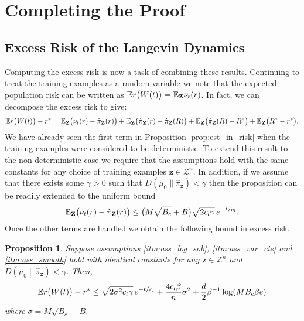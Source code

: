 \documentclass{article}
\newtheorem{proposition}[theorem]{Proposition}
\newcommand{\Bbf}[1]{\mathbf{#1}}
\newcommand{\Bcal}[1]{\mathcal{#1}}
\begin{document}
\section{Completing the Proof}
\subsection{Excess Risk of the Langevin Dynamics}
Computing the excess risk is now a task of combining these results. Continuing to treat the training examples as a random variable we note that the expected population risk can be written as \(\Bbb{E} r \big ( W(t) \big ) = \Bbb{E}_{\Bbf{Z}}\nu_t(r)\). In fact, we can decompose the excess risk to give:
\begin{equation}\label{eq:excess_risk_decomp}
     \Bbb{E} r \big ( W(t) \big ) - r^* = \Bbb{E}_{\Bbf{Z}}\big ( \nu_t(r) - \hat{\pi}_{\Bbf{Z}}(r) \big ) + \Bbb{E}_{\Bbf{Z}}\big ( \hat{\pi}_{\Bbf{Z}}(r) - \hat{\pi}_{\Bbf{Z}}(R) \big ) + \Bbb{E}_{\Bbf{Z}}\big ( \hat{\pi}_{\Bbf{Z}}(R) - R^* \big ) + \Bbb{E}_{\Bbf{Z}}\big ( R^* - r^* \big ).
\end{equation}
We have already seen the first term in Proposition \ref{prop:est_in_risk} when the training examples were considered to be deterministic. To extend this result to the non-deterministic case we require that the assumptions hold with the same constants for any choice of training examples \(\Bbf{z} \in \Bcal{Z}^n\). In addition, if we assume that there exists some \(\gamma > 0\) such that \(D(\mu_0 \| \hat{\pi}_{\Bbf{z}}) < \gamma\) then the proposition can be readily extended to the uniform bound
\begin{equation}\label{eq:est_in_risk_uni}
    \Bbb{E}_{\Bbf{Z}}\big ( \nu_t(r) - \hat{\pi}_{\Bbf{Z}}(r) \big ) \leq \big ( M\sqrt{B_c} + B \big ) \sqrt{2 c_l \gamma} \, e^{-t/c_l}.
\end{equation}
Once the other terms are handled we obtain the following bound in excess risk.

\begin{proposition}\label{prop:excess_risk}
Suppose assumptions \ref{itm:ass_log_sob}, \ref{itm:ass_var_cts} and \ref{itm:ass_smooth} hold with identical constants for any \(\Bbf{z} \in \Bcal{Z}^n\) and \(D(\mu_0 \| \hat{\pi}_{\Bbf{z}}) < \gamma\). Then,
\begin{equation*}
    \Bbb{E} r \big ( W(t) \big ) - r^* \leq \sqrt{2 \sigma^2 c_l \gamma} \, e^{-t/c_l} + \frac{4 c_l \beta}{n} \sigma^2 + \frac{d}{2} \beta^{-1} \log(MB_c \beta e)
\end{equation*}
where \(\sigma = M \sqrt{B_c} + B\).
\end{proposition}
\end{document}
